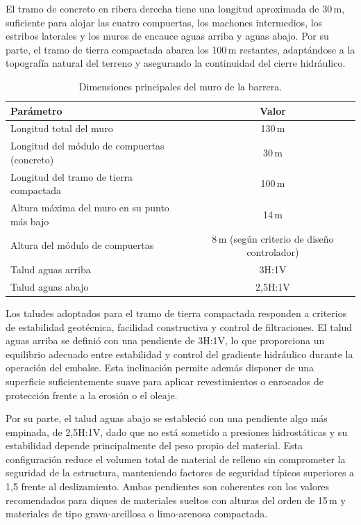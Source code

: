 \documentclass{article} %
\begin{document}
El tramo de concreto en ribera derecha tiene una longitud aproximada de 30\,m, suficiente para alojar las cuatro compuertas, los machones intermedios, los estribos laterales y los muros de encauce aguas arriba y aguas abajo. Por su parte, el tramo de tierra compactada abarca los 100\,m restantes, adaptándose a la topografía natural del terreno y asegurando la continuidad del cierre hidráulico.

\begin{table}[htbp]
\centering
\begin{tabular}{lc}
\hline
\textbf{Parámetro} & \textbf{Valor} \\
\hline
Longitud total del muro & 130\,m \\
Longitud del módulo de compuertas (concreto) & 30\,m \\
Longitud del tramo de tierra compactada & 100\,m \\
Altura máxima del muro en su punto más bajo & 14\,m \\
Altura del módulo de compuertas & 8\,m (según criterio de diseño controlador) \\
Talud aguas arriba & 3H:1V \\
Talud aguas abajo & 2{,}5H:1V \\
\hline
\end{tabular}
\caption{Dimensiones principales del muro de la barrera.}
\label{tab:dimensiones_muro}
\end{table}

Los taludes adoptados para el tramo de tierra compactada responden a criterios de estabilidad geotécnica, facilidad constructiva y control de filtraciones. El talud aguas arriba se definió con una pendiente de 3H:1V, lo que proporciona un equilibrio adecuado entre estabilidad y control del gradiente hidráulico durante la operación del embalse. Esta inclinación permite además disponer de una superficie suficientemente suave para aplicar revestimientos o enrocados de protección frente a la erosión o el oleaje.

Por su parte, el talud aguas abajo se estableció con una pendiente algo más empinada, de 2{,}5H:1V, dado que no está sometido a presiones hidrostáticas y su estabilidad depende principalmente del peso propio del material. Esta configuración reduce el volumen total de material de relleno sin comprometer la seguridad de la estructura, manteniendo factores de seguridad típicos superiores a 1{,}5 frente al deslizamiento. Ambas pendientes son coherentes con los valores recomendados para diques de materiales sueltos con alturas del orden de 15\,m y materiales de tipo grava-arcillosa o limo-arenosa compactada.
\end{document}
